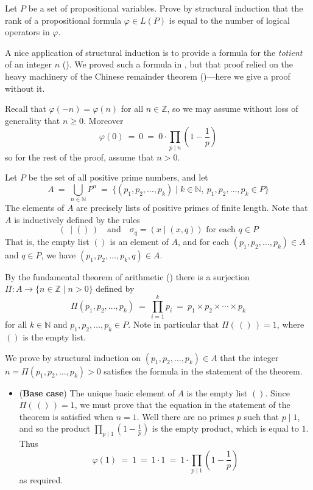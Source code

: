 \begin{exercise}
Let $P$ be a set of propositional variables. Prove by structural induction that the rank of a propositional formula $\varphi \in L(P)$ is equal to the number of logical operators in $\varphi$.
\end{exercise}

A nice application of structural induction is to provide a formula for the \textit{totient} of an integer $n$ (). We proved such a formula in , but that proof relied on the heavy machinery of the Chinese remainder theorem ()---here we give a proof without it.

\rthmTotientFormula*

\begin{cproof}
Recall that $\varphi(-n) = \varphi(n)$ for all $n \in \mathbb{Z}$, so we may assume without loss of generality that $n \ge 0$. Moreover
\[ \varphi(0) ~=~ 0 ~=~ 0 \cdot \prod_{p \mid n} \left( 1- \frac{1}{p} \right) \]
so for the rest of the proof, assume that $n>0$.

Let $P$ be the set of all positive prime numbers, and let
\[ A ~=~ \bigcup_{n \in \mathbb{N}} P^n ~=~ \{ (p_1,p_2,\dots,p_k) \mid k \in \mathbb{N},~ p_1,p_2,\dots,p_k \in P \} \]
The elements of $A$ are precisely lists of positive primes of finite length. Note that $A$ is inductively defined by the rules
\[ (~ \mid ()\,) \quad \text{and} \quad \sigma_q = (x \mid (x,q)) \text{ for each } q \in P \]
That is, the empty list $()$ is an element of $A$, and for each $(p_1,p_2,\dots,p_k) \in A$ and $q \in P$, we have $(p_1,p_2,\dots,p_k,q) \in A$.

By the fundamental theorem of arithmetic () there is a surjection $\Pi : A \to \{ n \in \mathbb{Z} \mid n > 0 \}$ defined by
\[ \Pi(p_1,p_2,\dots,p_k) ~=~ \prod_{i=1}^k p_i ~=~ p_1 \times p_2 \times \cdots \times p_k \]
for all $k \in \mathbb{N}$ and $p_1,p_2,\dots,p_k \in P$. Note in particular that $\Pi(\,()\,) = 1$, where $()$ is the empty list.

We prove by structural induction on $(p_1,p_2,\dots,p_k) \in A$ that the integer $n = \Pi(p_1,p_2,\dots,p_k) > 0$ satisfies the formula in the statement of the theorem. 

\begin{itemize}
\item (\textbf{Base case}) The unique basic element of $A$ is the empty list $()$. Since $\Pi(\,()\,) = 1$, we must prove that the equation in the statement of the theorem is satisfied when $n=1$. Well there are no primes $p$ such that $p \mid 1$, and so the product $\prod_{p \mid 1} \left( 1 - \frac{1}{p} \right)$ is the empty product, which is equal to $1$. Thus
\[ \varphi(1) ~=~ 1 ~=~ 1 \cdot 1 ~=~ 1 \cdot \prod_{p \mid 1} \left( 1- \frac{1}{p} \right) \]
as required.


\end{itemize}
\end{cproof}
